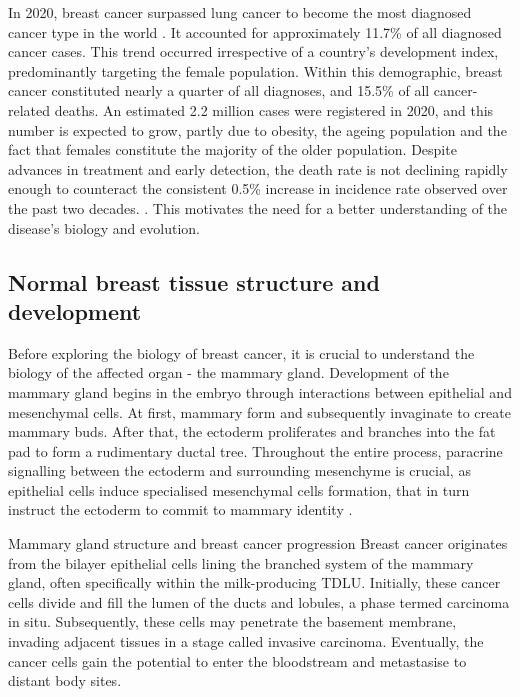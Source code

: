 
In 2020, breast cancer surpassed lung cancer to become the most diagnosed cancer type in the world \parencite{Sung2021-xv}. It accounted for approximately 11.7\% of all diagnosed cancer cases. This trend occurred irrespective of a country's development index, predominantly targeting the female population. Within this demographic, breast cancer constituted nearly a quarter of all diagnoses, and 15.5\% of all cancer-related deaths. An estimated 2.2 million cases were registered in 2020, and this number is expected to grow, partly due to obesity, the ageing population and the fact that females constitute the majority of the older population. Despite advances in treatment and early detection, the death rate is not declining rapidly enough to counteract the consistent 0.5\% increase in incidence rate observed over the past two decades. \parencite{Cronin2022-mc}. This motivates the need for a better understanding of the disease's biology and evolution.

\subsection{Normal breast tissue structure and development}
\label{sec:applications-normal-breast-development}
Before exploring the biology of breast cancer, it is crucial to understand the biology of the affected organ - the mammary gland. Development of the mammary gland begins in the embryo through interactions between epithelial and mesenchymal cells. At first, mammary  form and subsequently invaginate to create mammary buds. After that, the ectoderm proliferates and branches into the fat pad to form a rudimentary ductal tree. Throughout the entire process, paracrine signalling between the ectoderm and surrounding mesenchyme is crucial, as epithelial cells induce specialised mesenchymal cells formation, that in turn instruct the ectoderm to commit to mammary identity \parencite{Macias2012-su,Spina2021-ej}.

    {Mammary gland structure and breast cancer progression}
    {Breast cancer originates from the bilayer epithelial cells lining the branched system of the mammary gland, often specifically within the milk-producing \acf{TDLU}. Initially, these cancer cells divide and fill the lumen of the ducts and lobules, a phase termed carcinoma in situ. Subsequently, these cells may penetrate the basement membrane, invading adjacent tissues in a stage called invasive carcinoma. Eventually, the cancer cells gain the potential to enter the bloodstream and metastasise to distant body sites.}

